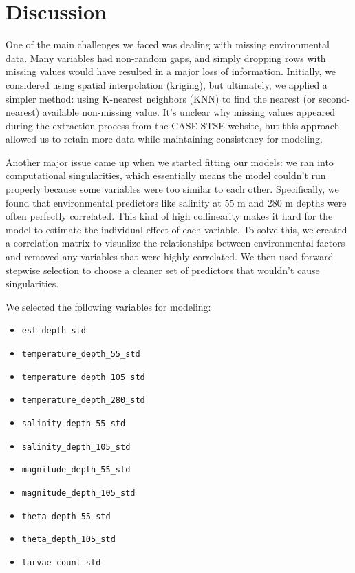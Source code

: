 \documentclass[
]{article}
\providecommand{\tightlist}{%
  \setlength{\itemsep}{0pt}\setlength{\parskip}{0pt}}
\begin{document}
\section{Discussion}\label{discussion}

One of the main challenges we faced was dealing with missing
environmental data. Many variables had non-random gaps, and simply
dropping rows with missing values would have resulted in a major loss of
information. Initially, we considered using spatial interpolation
(kriging), but ultimately, we applied a simpler method: using K-nearest
neighbors (KNN) to find the nearest (or second-nearest) available
non-missing value. It's unclear why missing values appeared during the
extraction process from the CASE-STSE website, but this approach allowed
us to retain more data while maintaining consistency for modeling.

Another major issue came up when we started fitting our models: we ran
into computational singularities, which essentially means the model
couldn't run properly because some variables were too similar to each
other. Specifically, we found that environmental predictors like
salinity at 55 m and 280 m depths were often perfectly correlated. This
kind of high collinearity makes it hard for the model to estimate the
individual effect of each variable. To solve this, we created a
correlation matrix to visualize the relationships between environmental
factors and removed any variables that were highly correlated. We then
used forward stepwise selection to choose a cleaner set of predictors
that wouldn't cause singularities.

We selected the following variables for modeling:

\begin{itemize}
\tightlist
\item
  \texttt{est\_depth\_std}
\item
  \texttt{temperature\_depth\_55\_std}
\item
  \texttt{temperature\_depth\_105\_std}
\item
  \texttt{temperature\_depth\_280\_std}
\item
  \texttt{salinity\_depth\_55\_std}
\item
  \texttt{salinity\_depth\_105\_std}
\item
  \texttt{magnitude\_depth\_55\_std}
\item
  \texttt{magnitude\_depth\_105\_std}
\item
  \texttt{theta\_depth\_55\_std}
\item
  \texttt{theta\_depth\_105\_std}
\item
  \texttt{larvae\_count\_std}
\end{itemize}
\end{document}
